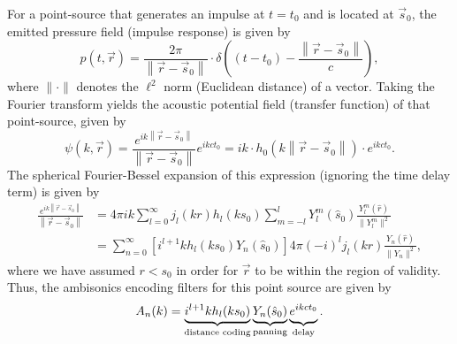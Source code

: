 For a point-source that generates an impulse at $t = t_0$ and is located at $\vec{s}_0$, the emitted pressure field (impulse response) is given by
\begin{equation}
p(t,\vec{r}) = \frac{2 \pi}{\left\| \vec{r} - \vec{s}_0 \right\|} \cdot \delta \left( (t-t_0) - \frac{\left\| \vec{r} - \vec{s}_0 \right\|}{c} \right),
\end{equation}
where $\|\cdot\|$ denotes the $\ell^2$ norm (Euclidean distance) of a vector.
Taking the Fourier transform yields the acoustic potential field (transfer function) of that point-source, given by \citep[Eq.~(6.73)]{Williams1999}
\begin{equation}\label{eq:02_Acoustical_Theory:PointSource}
\psi(k,\vec{r}) = \frac{e^{i k \left\| \vec{r} - \vec{s}_0 \right\|}}{\left\| \vec{r} - \vec{s}_0 \right\|} e^{i k c t_0} = i k \cdot h_0 (k \left\| \vec{r} - \vec{s}_0 \right\| ) \cdot e^{i k c t_0}.
\end{equation} %
The spherical Fourier-Bessel expansion of this expression (ignoring the time delay term) is given by~\citep[Eq.~(8.22)]{Williams1999}
\begin{align}
\frac{e^{i k \left\| \vec{r} - \vec{s}_0 \right\|}}{\left\| \vec{r} - \vec{s}_0 \right\|} &= 4 \pi i k \sum_{l=0}^{\infty} j_l(k r) h_l(k s_0) \sum_{m=-l}^{l} Y_l^m (\hat{s}_0) \frac{Y_l^m (\hat{r})}{\|Y_l^m\|^2} \\
	&= \sum_{n=0}^{\infty} \left[ i^{l+1} k h_l(k s_0) Y_n (\hat{s}_0) \right] 4 \pi (-i)^l j_l(k r) \frac{Y_n (\hat{r})}{\|Y_n\|^2},
\end{align} %
where we have assumed $r < s_0$ in order for $\vec{r}$ to be within the region of validity.
Thus, the ambisonics encoding filters for this point source are given by
\begin{equation}\label{eq:02_Acoustical_Theory:PointSource_An}
A_n(k) = \underbrace{i^{l+1} k h_l(k s_0)}_{\text{distance coding}} \underbrace{Y_n (\hat{s}_0)}_{\text{panning}} \underbrace{ \vphantom{ Y_n (\hat{s}_0) } e^{i k c t_0}}_{\text{delay}}.
\end{equation}


